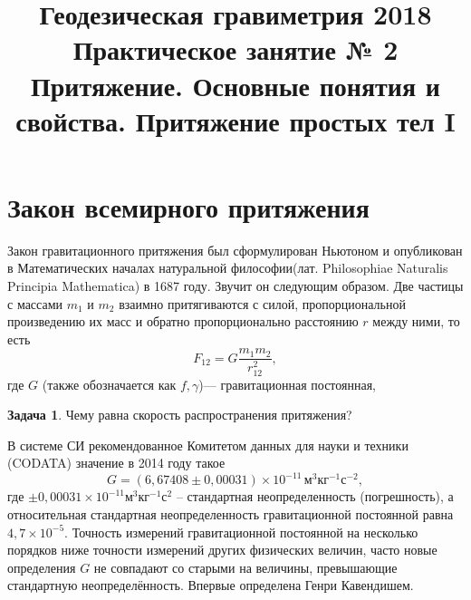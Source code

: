 \documentclass[11pt, a4paper]{article}
\title{{\Large Геодезическая гравиметрия 2018}\\ 
    {\bf\Large Практическое занятие № 2} \\
{\Large Притяжение. Основные понятия и свойства. Притяжение простых тел I}}
\author{}
\date{\DTMusedate{lessondate}}
\theoremstyle{plain}
\theoremstyle{definition}
\newtheorem{problem}{Задача}[section]
\theoremstyle{remark}
\begin{document}
\maketitle

\section{Закон всемирного притяжения}

Закон гравитационного притяжения был сформулирован Ньютоном и опубликован в Математических началах
натуральной философии\cite{Newton1687}(лат. Philosophiae Naturalis Principia Mathematica) в 1687
году.
Звучит он следующим образом. Две частицы с массами $m_1$ и $m_2$ взаимно притягиваются с силой,
пропорциональной произведению их масс и обратно пропорционально расстоянию $r$ между ними, то есть
\begin{equation*}
    F_{12} = G\dfrac{m_1m_2}{r_{12}^2},
\end{equation*}
где $G$ (также обозначается как $f,\gamma$)--- гравитационная постоянная, 

\begin{problem}
    Чему равна скорость распространения притяжения?
\end{problem}

В системе СИ рекомендованное Комитетом данных для науки и техники (CODATA) значение в 2014
году\cite{CODATA2014} такое
\begin{equation*}
    G = (6,67408 \pm 0,00031)\times10^{-11}\,\text{м}^3\text{кг}^{-1}\text{с}^{-2},
\end{equation*}
где $\pm0,00031\times10^{-11}\text{м}^3\text{кг}^{-1}\text{с}^2$ -- стандартная неопределенность
(погрешность), а относительная стандартная неопределенность гравитационной постоянной
равна $4,7\times10^{-5}$. Точность измерений гравитационной постоянной на несколько порядков ниже
точности измерений других физических величин,  часто новые определения $G$ не совпадают со старыми
на величины, превышающие стандартную неопределённость. Впервые определена Генри Кавендишем.
\end{document}
